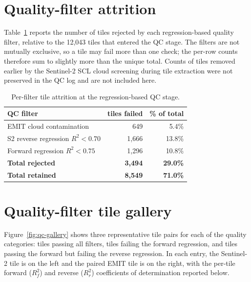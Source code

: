 \section{Quality-filter attrition}
\label{app:qc-attrition}

Table~\ref{tab:qc-filters} reports the number of tiles rejected by each
regression-based quality filter, relative to the 12{,}043 tiles that
entered the QC stage. The filters are not mutually exclusive, so a tile
may fail more than one check; the per-row counts therefore sum to
slightly more than the unique total. Counts of tiles removed earlier by
the Sentinel-2 SCL cloud screening during tile extraction were not
preserved in the QC log and are not included here.

\begin{table}[h]
  \centering
  \begin{tabular}{lrr}
    \toprule
    QC filter & tiles failed & \% of total \\
    \midrule
    EMIT cloud contamination                       & 649    & 5.4\% \\
    S2 reverse regression $R^2 < 0.70$             & 1{,}666 & 13.8\% \\
    Forward regression $R^2 < 0.75$                & 1{,}296 & 10.8\% \\
    \midrule
    \textbf{Total rejected}                        & \textbf{3{,}494} & \textbf{29.0\%} \\
    \textbf{Total retained}                        & \textbf{8{,}549} & \textbf{71.0\%} \\
    \bottomrule
  \end{tabular}
  \caption{Per-filter tile attrition at the regression-based QC stage.}
  \label{tab:qc-filters}
\end{table}


\section{Quality-filter tile gallery}
\label{app:qc-gallery}

Figure~\ref{fig:qc-gallery} shows three representative tile pairs for
each of the quality categories: tiles passing all filters, tiles
failing the forward regression, and tiles passing the forward but
failing the reverse regression. In each entry, the Sentinel-2 tile is
on the left and the paired EMIT tile is on the right, with the
per-tile forward ($R^2_f$) and reverse ($R^2_r$) coefficients of
determination reported below.

